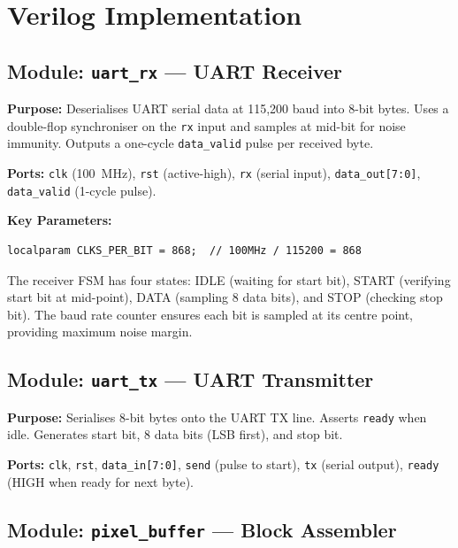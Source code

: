 \documentclass[12pt,a4paper]{article}
\begin{document}
\section{Verilog Implementation}

\subsection{Module: \texttt{uart\_rx} — UART Receiver}

\textbf{Purpose:} Deserialises UART serial data at 115,200 baud into 8-bit bytes. Uses a double-flop synchroniser on the \texttt{rx} input and samples at mid-bit for noise immunity. Outputs a one-cycle \texttt{data\_valid} pulse per received byte.

\textbf{Ports:} \texttt{clk} (100~MHz), \texttt{rst} (active-high), \texttt{rx} (serial input), \texttt{data\_out[7:0]}, \texttt{data\_valid} (1-cycle pulse).

\textbf{Key Parameters:}
\begin{lstlisting}
localparam CLKS_PER_BIT = 868;  // 100MHz / 115200 = 868
\end{lstlisting}

The receiver FSM has four states: IDLE (waiting for start bit), START (verifying start bit at mid-point), DATA (sampling 8 data bits), and STOP (checking stop bit). The baud rate counter ensures each bit is sampled at its centre point, providing maximum noise margin.

\subsection{Module: \texttt{uart\_tx} — UART Transmitter}

\textbf{Purpose:} Serialises 8-bit bytes onto the UART TX line. Asserts \texttt{ready} when idle. Generates start bit, 8 data bits (LSB first), and stop bit.

\textbf{Ports:} \texttt{clk}, \texttt{rst}, \texttt{data\_in[7:0]}, \texttt{send} (pulse to start), \texttt{tx} (serial output), \texttt{ready} (HIGH when ready for next byte).

\subsection{Module: \texttt{pixel\_buffer} — Block Assembler}
\end{document}
